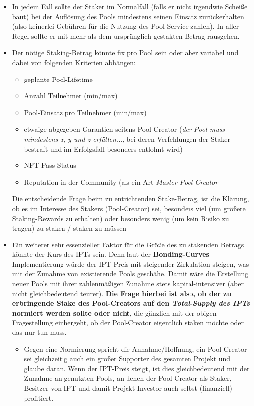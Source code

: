 \begin{itemize}
	\item In jedem Fall sollte der Staker im Normalfall (falls er nicht irgendwie Scheiße baut) bei der Auflösung des Pools mindestens seinen Einsatz zurückerhalten (also keinerlei Gebühren für die Nutzung des Pool-Service zahlen). In aller Regel sollte er mit mehr als dem ursprünglich gestakten Betrag rausgehen.
	\item Der nötige Staking-Betrag könnte fix pro Pool sein oder aber variabel und dabei von folgenden Kriterien abhängen:
	\begin{itemize}
		\item geplante Pool-Lifetime
		\item Anzahl Teilnehmer (min/max)
		\item Pool-Einsatz pro Teilnehmer (min/max)
		\item etwaige abgegeben Garantien seitens Pool-Creator (\textit{der Pool muss mindestens x, y und z erfüllen...}, bei deren Verfehlungen der Staker bestraft und im Erfolgsfall besonders entlohnt wird)
		\item NFT-Pass-Status
		\item Reputation in der Community (als ein Art \textit{Master Pool-Creator}
	\end{itemize}
	Die entscheidende Frage beim zu entrichtenden Stake-Betrag, ist die Klärung, ob es im Interesse des Stakers (Pool-Creator) sei, besonders viel (um größere Staking-Rewards zu erhalten) oder besonders wenig (um kein Risiko zu tragen) zu staken / staken zu müssen.
	\item Ein weiterer sehr essenzieller Faktor für die Größe des zu stakenden Betrags könnte der Kurs des IPTs sein. Denn laut der \textbf{Bonding-Curves}-Implementierung würde der IPT-Preis mit steigender Zirkulation steigen, was mit der Zunahme von existierende Pools geschähe. Damit wäre die Erstellung neuer Pools mit ihrer zahlenmäßigen Zunahme stets kapital-intensiver (aber nicht gleichbedeutend teurer). \textbf{Die Frage hierbei ist also, ob der zu erbringende Stake des Pool-Creators auf den \textit{Total-Supply des IPTs} normiert werden sollte oder nicht}, die gänzlich mit der obigen Fragestellung einhergeht, ob der Pool-Creator eigentlich staken möchte oder das nur tun muss.
	\begin{itemize}
		\item Gegen eine Normierung spricht die Annahme/Hoffnung, ein Pool-Creator sei gleichzeitig auch ein großer Supporter des gesamten Projekt und glaube daran. Wenn der IPT-Preis steigt, ist dies gleichbedeutend mit der Zunahme an genutzten Pools, an denen der Pool-Creator als Staker, Besitzer von IPT und damit Projekt-Investor auch selbst (finanziell) profitiert.

\end{itemize}
\end{itemize}
